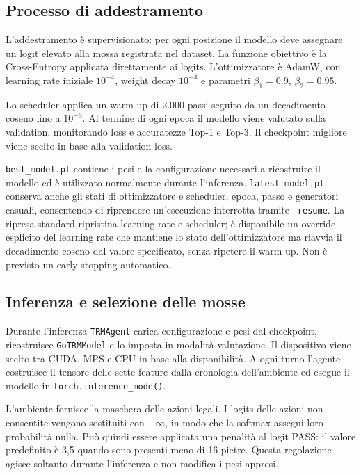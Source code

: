 \subsection{Processo di addestramento}

L'addestramento è supervisionato: per ogni posizione il modello deve assegnare un logit elevato alla mossa registrata nel dataset. La funzione obiettivo è la Cross-Entropy applicata direttamente ai logits. L'ottimizzatore è AdamW, con learning rate iniziale $10^{-4}$, weight decay $10^{-4}$ e parametri $\beta_1=0.9$, $\beta_2=0.95$.

Lo scheduler applica un warm-up di 2.000 passi seguito da un decadimento coseno fino a $10^{-5}$. Al termine di ogni epoca il modello viene valutato sulla validation, monitorando loss e accuratezze Top-1 e Top-3. Il checkpoint migliore viene scelto in base alla validation loss.

\texttt{best\_model.pt} contiene i pesi e la configurazione necessari a ricostruire il modello ed è utilizzato normalmente durante l'inferenza. \texttt{latest\_model.pt} conserva anche gli stati di ottimizzatore e scheduler, epoca, passo e generatori casuali, consentendo di riprendere un'esecuzione interrotta tramite \texttt{--resume}. La ripresa standard ripristina learning rate e scheduler; è disponibile un override esplicito del learning rate che mantiene lo stato dell'ottimizzatore ma riavvia il decadimento coseno dal valore specificato, senza ripetere il warm-up. Non è previsto un early stopping automatico.

\subsection{Inferenza e selezione delle mosse}

Durante l'inferenza \texttt{TRMAgent} carica configurazione e pesi dal checkpoint, ricostruisce \texttt{GoTRMModel} e lo imposta in modalità valutazione. Il dispositivo viene scelto tra CUDA, MPS e CPU in base alla disponibilità. A ogni turno l'agente costruisce il tensore delle sette feature dalla cronologia dell'ambiente ed esegue il modello in \texttt{torch.inference\_mode()}.

L'ambiente fornisce la maschera delle azioni legali. I logits delle azioni non consentite vengono sostituiti con $-\infty$, in modo che la softmax assegni loro probabilità nulla. Può quindi essere applicata una penalità al logit PASS: il valore predefinito è 3,5 quando sono presenti meno di 16 pietre. Questa regolazione agisce soltanto durante l'inferenza e non modifica i pesi appresi.

